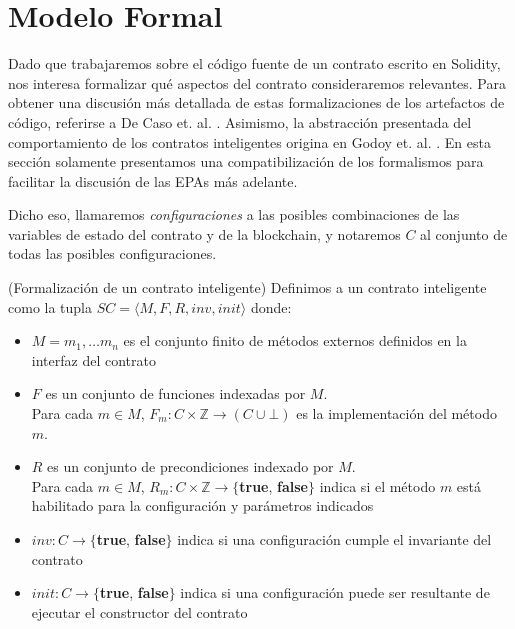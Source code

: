 \section{Modelo Formal}
Dado que trabajaremos sobre el código fuente de un contrato escrito en Solidity, nos interesa formalizar qué aspectos del contrato consideraremos relevantes.
Para obtener una discusión más detallada de estas formalizaciones de los artefactos de código, referirse a De Caso et. al.  \cite{de-caso-epa}.
Asimismo, la abstracción presentada del comportamiento de los contratos inteligentes origina en Godoy et. al. \cite{predicate-abstraction-for-smart-contract-validation}.
En esta sección solamente presentamos una compatibilización de los formalismos para facilitar la discusión de las EPAs más adelante.

Dicho eso, llamaremos \textit{configuraciones} a las posibles combinaciones de las variables de estado del contrato y de la blockchain, y notaremos $C$ al conjunto de todas las posibles configuraciones.

\begin{definition}(Formalización de un contrato inteligente)
    \label{definicion-smart-contract}
    Definimos a un contrato inteligente como la tupla $SC = \langle M, F, R, inv, init \rangle$ donde:

    \begin{itemize}
        \item $M = {m_1, \dots m_n}$ es el conjunto finito de métodos externos definidos en la interfaz del contrato
        \item $F$ es un conjunto de funciones indexadas por $M$. \\
              Para cada $m \in M$, $F_m : C \times \mathds{Z} \rightarrow (C \cup \bot)$ es la implementación del método $m$.
        \item $R$ es un conjunto de precondiciones indexado por $M$.\\
              Para cada $m \in M$, $R_m : C \times \mathds{Z} \rightarrow \{$\textbf{true}, \textbf{false}$\}$ indica si el método $m$ está habilitado para la configuración y parámetros indicados
        \item $inv : C \rightarrow \{$\textbf{true}, \textbf{false}$\}$ indica si una configuración cumple el invariante del contrato
        \item $init : C \rightarrow \{$\textbf{true}, \textbf{false}$\}$ indica si una configuración puede ser resultante de ejecutar el constructor del contrato
    \end{itemize}
\end{definition}

